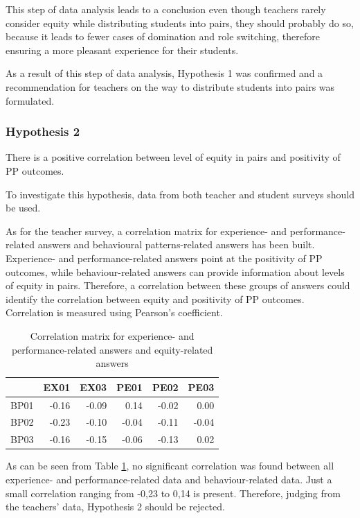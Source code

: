 \documentclass[conference]{IEEEtran}
\begin{document}
This step of data analysis leads to a conclusion even though teachers rarely consider equity while distributing students into pairs, they should probably do so, because it leads to fewer cases of domination and role switching, therefore ensuring a more pleasant experience for their students. 

As a result of this step of data analysis, Hypothesis 1 was confirmed and a recommendation for teachers on the way to distribute students into pairs was formulated.

\subsubsection{Hypothesis 2}
There is a positive correlation between level of equity in pairs and positivity of PP outcomes.

To investigate this hypothesis, data from both teacher and student surveys should be used. 

As for the teacher survey, a correlation matrix for experience- and performance-related answers and behavioural patterns-related answers has been built. Experience- and performance-related answers point at the positivity of PP outcomes, while behaviour-related answers can provide information about levels of equity in pairs. Therefore, a correlation between these groups of answers could identify the correlation between equity and positivity of PP outcomes. Correlation is measured using Pearson's coefficient.

\begin{table}[ht]
    \centering
    \begin{tabular}{|l|r|r|r|r|r|}
    \hline
    {} &      EX01 &      EX03 & PE01 & PE02 & PE03 \\
    \hline
    BP01 & -0.16 & -0.09 & 0.14 & -0.02 & 0.00\\
    \hline
    BP02 & -0.23 & -0.10 & -0.04 & -0.11 & -0.04\\
    \hline
    BP03 & -0.16 & -0.15 & -0.06 & -0.13 & 0.02\\
    \hline
    \end{tabular}
    \caption{Correlation matrix for experience- and performance-related answers and equity-related answers}
    \label{tab:table2}
\end{table}

As can be seen from Table \ref{tab:table2}, no significant correlation was found between all experience- and performance-related data and behaviour-related data. Just a small correlation ranging from -0,23 to 0,14 is present. Therefore, judging from the teachers' data, Hypothesis 2 should be rejected.
\end{document}
